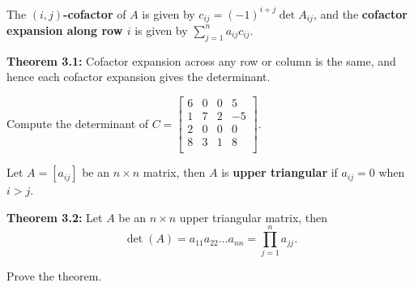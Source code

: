 \begin{enumerate}
\vfill

\begin{defn} The {\bf $(i,j)$-cofactor} of $A$ is given by $c_{ij} =(-1)^{i+j} \operatorname{det} A_{ij}$, and the {\bf cofactor expansion along row $i$} is given by $\sum_{j=1}^{n}a_{ij} c_{ij}$.
\end{defn}



{\bf Theorem 3.1:} Cofactor expansion across any row or column is the same, and hence each cofactor expansion gives the determinant.

\newpage

\Problem Compute the determinant of 
$C=\begin{bmatrix}
6 & 0 & 0 & 5\\
1 & 7 & 2 & -5\\
2 & 0 & 0 & 0\\
8 & 3 & 1 & 8\\
\end{bmatrix}$.

\vfill

\begin{defn} Let $A=[a_{ij}]$ be an $n\times n$ matrix, then $A$ is {\bf upper triangular} if $a_{ij}=0$ when $i>j$.
\end{defn}

{\bf Theorem 3.2:} Let $A$ be an $n\times n$ upper triangular matrix, then $$\operatorname{det}(A)= a_{11}a_{22}\dots a_{nn} = \prod_{j=1}^n a_{jj}.$$

\Problem Prove the theorem.

\vfill
\vfill

\end{enumerate}

